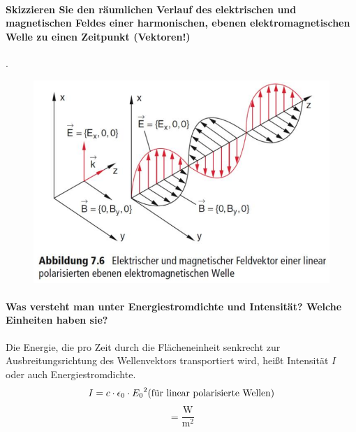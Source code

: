 \documentclass[a4paper, 11pt, parskip=half]{scrartcl}
\begin{document}
\paragraph{Skizzieren Sie den räumlichen Verlauf des elektrischen und magnetischen Feldes einer
harmonischen, ebenen elektromagnetischen Welle zu einen Zeitpunkt (Vektoren!)}.
\begin{figure}[H]
    \centering
    \includegraphics[width=10 cm]{image/13/4.png}
\end{figure}

\paragraph{Was versteht man unter Energiestromdichte und Intensität? Welche Einheiten haben sie?}
Die Energie, die pro Zeit durch die Flächeneinheit senkrecht zur Ausbreitungsrichtung des Wellenvektors transportiert wird, heißt Intensität $I$ oder auch Energiestromdichte.
\begin{equation}
I = c \cdot \epsilon_0 \cdot {E_0}^2 \text{(für linear polarisierte Wellen)} \\
\end{equation}
\begin{equation}
[I] = \frac{\text{W}}{\text{m}^2}
\end{equation}
\end{document}
